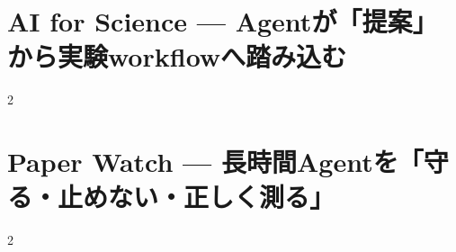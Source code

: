 \documentclass[lualatex,a4paper,11pt]{jlreq}
\begin{document}
\clearpage
\section{AI for Science — Agentが「提案」から実験workflowへ踏み込む}
\label{pkg:ai-for-science-june}
\vspace{0.15em}
\begin{multicols}{2}

\end{multicols}
\Needspace{0.34\textheight}

\medskip


\clearpage
\section{Paper Watch — 長時間Agentを「守る・止めない・正しく測る」}
\label{pkg:paper-watch-june}
\vspace{0.15em}
\begin{multicols}{2}

\end{multicols}


\clearpage

\clearpage
\printbibliography[title={References / Source Notes}]
\end{document}
